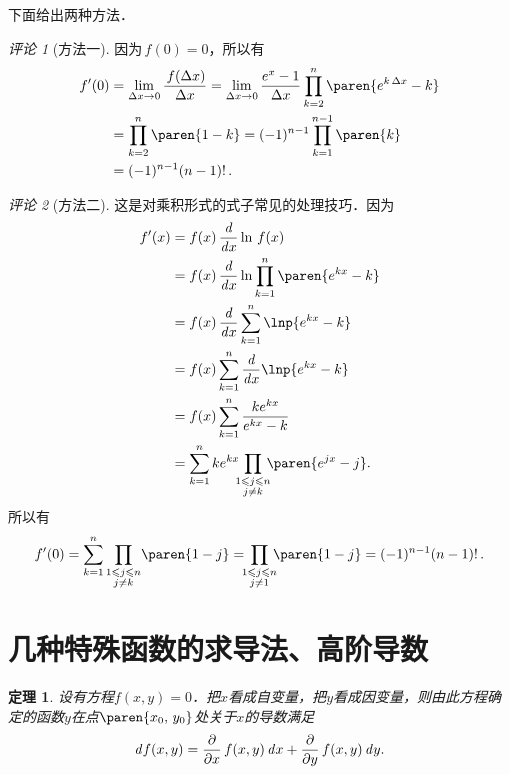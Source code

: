 \documentclass[a4paper,punct=CCT]{ctexbook}
\newtheorem*{theorem*}{定理}
\theoremstyle{definition}
\theoremstyle{remark}
\newtheorem*{remark}{评论}
\let\leq\leqslant
\let\le\leq
\begin{document}
\begin{enumerate}
  下面给出两种方法．
  \begin{remark}[方法一]
    因为\(\,f(0) = 0\)，所以有
    \begin{equation*}
      \begin{split}
        f'(0)
        &= \lim_{\fdx \to 0} \frac{\,f(\fdx)}{\fdx}
        = \lim_{\fdx \to 0} \frac{e^x-1}{\fdx} \prod_{k=2}^n \paren{e^{k\fdx}-k} \\
        &= \prod_{k=2}^n \paren{1-k}
        = (-1)^{n-1} \prod_{k=1}^{n-1} \paren{k} \\
        &= (-1)^{n-1} (n-1)!\,.
      \end{split}
    \end{equation*}
  \end{remark}
  \begin{remark}[方法二]
    这是对乘积形式的式子常见的处理技巧．因为
    \begin{equation*}
      \begin{split}
        f'(x)
        &= f(x) \,\ddx \ln\,f(x) \\
        &= f(x) \,\ddx \ln\prod_{k=1}^n \paren{e^{kx}-k} \\
        &= f(x) \,\ddx \sum_{k=1}^n \lnp{e^{kx}-k} \\
        &= f(x) \sum_{k=1}^n \ddx \lnp{e^{kx}-k} \\
        &= f(x) \sum_{k=1}^n \frac{ke^{kx}}{e^{kx}-k} \\
        &= \sum_{k=1}^n ke^{kx} \,\smashoperator{\prod_{\substack{1 \le j \le n \\ j \ne k}}}
        \,\paren{e^{jx}-j}.
      \end{split}
    \end{equation*}
    所以有
    \begin{equation*}
      f'(0)
      = \sum_{k=1}^n \prod_{\substack{1 \le j \le n \\ j \ne k}} \!\paren{1-j}
      = \,\smashoperator{\prod_{\substack{1 \le j \le n \\ j \ne 1}}} \,\paren{1-j}
      = (-1)^{n-1} (n-1)!\,.
    \end{equation*}
  \end{remark}
\end{enumerate}
\fi

\section{几种特殊函数的求导法、高阶导数}

\begin{theorem*}
  设有方程\(f(x,y) = 0\)．把\(x\)看成自变量，把\(y\)看成因变量，则由此方程确定的函数\(y\)在点\(\paren{x_0, \,y_0}\)处关于\(x\)的导数满足
  \begin{equation*}
    \mathop{}\!\mathit{d} f(x,y) = \frac\partial{\partial x}\,f(x,y) \mathop{}\!\mathit{d} x + \frac\partial{\partial y}\,f(x,y) \mathop{}\!\mathit{d} y.
  \end{equation*}
\end{theorem*}
\end{document}
